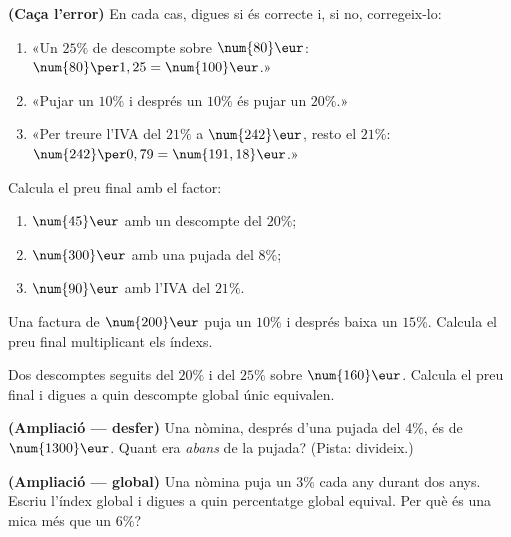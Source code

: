 \begin{exercicis}
\begin{exlist}
  \item \textbf{(Caça l'error)} En cada cas, digues si és correcte i, si no,
        corregeix-lo:
    \begin{enumerate}[label=\alph*), leftmargin=1.6em, topsep=2pt]
      \item «Un $25\%$ de descompte sobre $\num{80}\eur$: $\num{80}\per 1,25=\num{100}\eur$.»
      \item «Pujar un $10\%$ i després un $10\%$ és pujar un $20\%$.»
      \item «Per treure l'IVA del $21\%$ a $\num{242}\eur$, resto el $21\%$:
            $\num{242}\per 0,79=\num{191,18}\eur$.»
    \end{enumerate}
  \item Calcula el preu final amb el factor:
    \begin{enumerate}[label=\alph*), leftmargin=1.6em, topsep=2pt]
      \item $\num{45}\eur$ amb un descompte del $20\%$;
      \item $\num{300}\eur$ amb una pujada del $8\%$;
      \item $\num{90}\eur$ amb l'IVA del $21\%$.
    \end{enumerate}
  \item Una factura de $\num{200}\eur$ puja un $10\%$ i després baixa un $15\%$.
        Calcula el preu final multiplicant els índexs.
  \item Dos descomptes seguits del $20\%$ i del $25\%$ sobre $\num{160}\eur$. Calcula
        el preu final i digues a quin descompte global únic equivalen.
  \item \textbf{(Ampliació — desfer)} Una nòmina, després d'una pujada del $4\%$, és de
        $\num{1300}\eur$. Quant era \emph{abans} de la pujada? (Pista: divideix.)
  \item \textbf{(Ampliació — global)} Una nòmina puja un $3\%$ cada any durant dos anys.
        Escriu l'índex global i digues a quin percentatge global equival. Per què és una
        mica més que un $6\%$?
\end{exlist}
\end{exercicis}

